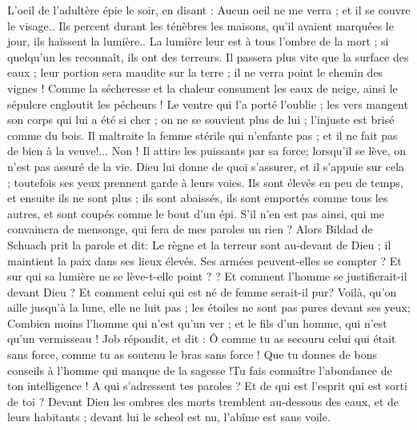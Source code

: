 \begin{multicols}{2}
L'oeil de l'adultère épie le soir, en disant : Aucun oeil ne me verra ; et il se couvre le visage..
Ils percent durant les ténèbres les maisons, qu'il avaient marquées le jour, ils haïssent la lumière..
La lumière leur est à tous l'ombre de la mort ; si quelqu'un les reconnaît, ils ont des terreurs.
Il passera plus vite que la surface des eaux ; leur portion sera maudite sur la terre ; il ne verra point le chemin des vignes !
Comme la sécheresse et la chaleur consument les eaux de neige, ainsi le sépulcre engloutit les pécheurs !
Le ventre qui l'a porté l'oublie ; les vers mangent son corps qui lui a été si cher ; on ne se souvient plus de lui ; l'injuste est brisé comme du bois.
Il maltraite la femme stérile qui n'enfante pas ; et il ne fait pas de bien à la veuve!...
Non ! Il attire  les puissants par sa force; lorsqu'il se lève, on n'est pas assuré de la vie. 
Dieu lui donne de quoi s'assurer, et il s'appuie sur cela ; toutefois ses yeux prennent garde à leurs voies.
Ils sont élevés en peu de temps, et ensuite ils ne sont plus ; ils sont abaissés, ils sont emportés comme tous les autres, et sont coupés comme le bout d'un épi. 
S'il n'en est pas ainsi, qui me convaincra de mensonge, qui fera de mes paroles un rien ?
\VerseOne{}Alors Bildad de Schuach prit la parole et dit: 
Le règne et la terreur sont au-devant de Dieu ; il maintient la paix dans ses lieux élevés.
 Ses armées peuvent-elles se compter ? Et sur qui sa lumière ne se lève-t-elle point ? ?
Et comment l'homme se justifierait-il devant Dieu ? Et comment celui qui est né de femme serait-il pur?
Voilà, qu'on aille jusqu'à la lune, elle ne luit pas ; les étoiles ne sont pas pures devant ses yeux;
Combien moins l'homme qui n'est qu'un ver ; et le fils d'un homme, qui n'est qu'un vermisseau  !
\VerseOne{}Job répondit, et dit :
Ô comme tu as secouru celui qui était sans force, comme tu as soutenu le bras sans force !
Que tu donnes de bons conseils à l'homme qui manque de la sagesse !Tu fais connaître l'abondance de ton intelligence !
A qui s'adressent tes paroles ? Et de qui est l'esprit qui est sorti de toi ?
Devant Dieu les ombres des morts tremblent au-dessous des eaux, et de leurs habitants ;
devant lui le scheol est nu, l'abîme est sans voile.

\end{multicols}
